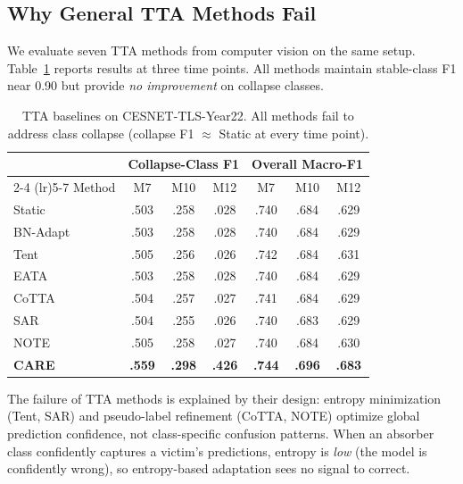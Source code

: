 \documentclass[journal]{IEEEtran}
\newcommand{\ours}{CARE}  %
\begin{document}
\subsection{Why General TTA Methods Fail}
\label{sec:tta_eval}

We evaluate seven TTA methods from computer vision on the same setup.
Table~\ref{tab:tta_baselines} reports results at three time points.
All methods maintain stable-class F1 near 0.90 but provide \textit{no improvement} on collapse classes.

\begin{table}[t]
\centering
\caption{TTA baselines on CESNET-TLS-Year22. All methods fail to address class collapse (collapse F1 $\approx$ Static at every time point).}
\label{tab:tta_baselines}
\small
\begin{tabular}{@{}l ccc ccc@{}}
\toprule
& \multicolumn{3}{c}{Collapse-Class F1} & \multicolumn{3}{c}{Overall Macro-F1} \\
\cmidrule(lr){2-4} \cmidrule(lr){5-7}
Method & M7 & M10 & M12 & M7 & M10 & M12 \\
\midrule
Static     & .503 & .258 & .028 & .740 & .684 & .629 \\
BN-Adapt   & .503 & .258 & .028 & .740 & .684 & .629 \\
Tent       & .505 & .256 & .026 & .742 & .684 & .631 \\
EATA       & .503 & .258 & .028 & .740 & .684 & .629 \\
CoTTA      & .504 & .257 & .027 & .741 & .684 & .629 \\
SAR        & .504 & .255 & .026 & .740 & .683 & .629 \\
NOTE       & .505 & .258 & .027 & .740 & .684 & .630 \\
\midrule
\textbf{\ours{}} & \textbf{.559} & \textbf{.298} & \textbf{.426} & \textbf{.744} & \textbf{.696} & \textbf{.683} \\
\bottomrule
\end{tabular}
\end{table}

The failure of TTA methods is explained by their design: entropy minimization (Tent, SAR) and pseudo-label refinement (CoTTA, NOTE) optimize global prediction confidence, not class-specific confusion patterns.
When an absorber class confidently captures a victim's predictions, entropy is \textit{low} (the model is confidently wrong), so entropy-based adaptation sees no signal to correct.


\end{document}
